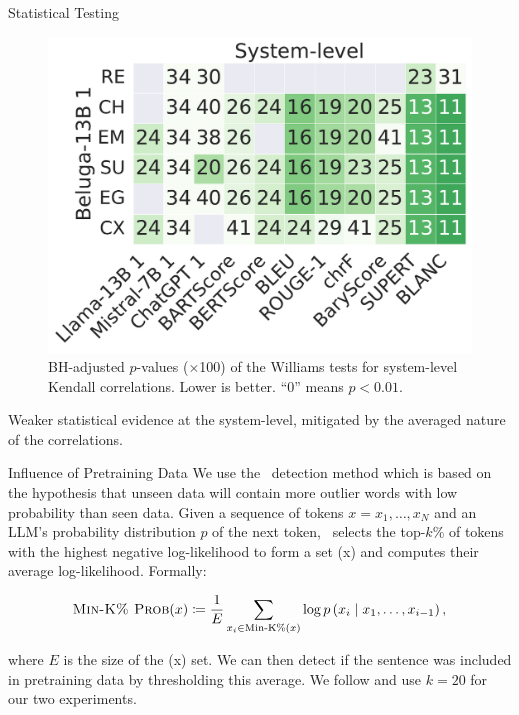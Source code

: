 \begin{frame}{Statistical Testing}
    \begin{figure}[!h]
        \centering
        \includegraphics[width=0.6\columnwidth]{pictures/llm_williams_kendall_system_bh.pdf}
        \caption{BH-adjusted $p$-values ($\times$100) of the Williams tests for system-level Kendall correlations. Lower is better. ``0'' means $p<0.01$.}
        \label{fig:williams_beluga_system}
    \end{figure}
    \vspace*{-0.4cm}
    Weaker statistical evidence at the system-level, mitigated by the averaged nature of the correlations.
\end{frame}

\begin{frame}{Influence of Pretraining Data}
    We use the \minkprob\ detection method \citep{shi2023detecting} which is based on the hypothesis that unseen data will contain more outlier words with low probability than seen data. Given a sequence of tokens $x = x_1, \dots, x_N$ and an LLM's probability distribution $p$ of the next token, \minkprob\ selects the top-$k$\% of tokens with the highest negative log-likelihood to form a set \mink(x) and computes their average log-likelihood. Formally:

    \[ \textsc{Min-K\% Prob} (x) \coloneqq \frac{1}{E} \sum_{x_i \in \textrm{Min-K\%}(x)} \log p \left(x_i \mid x_1, \dots, x_{i-1} \right) ,\]
    
    where $E$ is the size of the \mink(x) set. We can then detect if the sentence was included in pretraining data by thresholding this average. We follow \citet{shi2023detecting} and use $k=20$ for our two experiments.
\end{frame}

